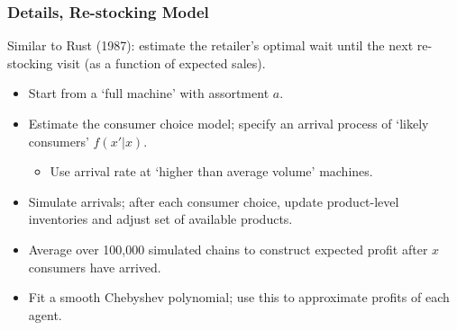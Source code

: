 \documentclass[aspectratio=169]{beamer}
\begin{document}
\begin{frame}[label=supplemental1]
\frametitle{Details, Re-stocking Model}
Similar to Rust (1987): estimate the retailer's optimal wait until the next re-stocking visit (as a function of expected sales).
\vfill
\begin{itemize}
\item Start from a `full machine' with assortment $a$.
\item Estimate the consumer choice model; specify an arrival process of `likely consumers' $f(x' | x)$.
\begin{itemize}
\item Use arrival rate at `higher than average volume' machines.%
\end{itemize}
\item Simulate arrivals; after each consumer choice, update product-level inventories and adjust set of available products.
\item Average over 100,000 simulated chains to construct expected profit after $x$ consumers have arrived.
\item Fit a smooth Chebyshev polynomial; use this to approximate profits of each agent.
\end{itemize}
\vfill
\hyperlink{main}{}
\end{frame}

\end{document}
